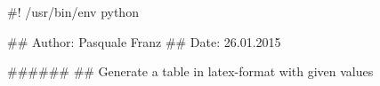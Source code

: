 #! /usr/bin/env python

## Author: Pasquale Franz
## Date: 26.01.2015

######
## Generate a table in latex-format with given values
